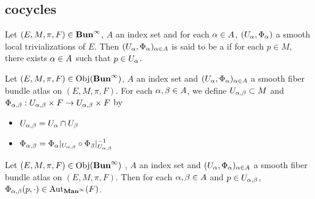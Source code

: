 \documentclass{book}
\begin{document}
	
	
	
	
	
	
	
	
	
	
	
	
	
	
	
	
	
	
	
	
	
	
	











	\subsection{cocycles}
	
	
	
	
	
	\begin{defn} 
		Let $(E, M, \pi, F) \in \operatorname*{\text{\textbf{Bun}}^{\infty}}$, $A$ an index set and for each $\alpha \in A$, $(U_{\alpha}, \Phi_{\alpha})$ a smooth local trivializations of $E$. Then $(U_{\alpha}, \Phi_{\alpha})_{\alpha \in A}$ is said to be a  if for each $p \in M$, there exists $\alpha \in A$ such that $p \in U_{\alpha}$.
	\end{defn}
	
	
	\begin{defn}
		Let $(E, M, \pi, F) \in \operatorname{Obj}(\operatorname*{\text{\textbf{Bun}}^{\infty}})$, $A$ an index set and $(U_{\alpha}, \Phi_{\alpha})_{\alpha \in A}$ a smooth fiber bundle atlas on $(E, M, \pi, F)$. For each $\alpha,\beta \in A$, we define $U_{\alpha,\beta} \subset M$ and $\Phi_{\alpha,\beta}: U_{\alpha,\beta} \times F \rightarrow U_{\alpha,\beta} \times F$ by 
		\begin{itemize}
			\item $U_{\alpha, \beta} = U_{\alpha} \cap U_{\beta}$
			\item $\Phi_{\alpha, \beta} = \Phi_{\alpha}|_{U_{\alpha, \beta}} \circ \Phi_{\beta}|_{U_{\alpha, \beta}}^{-1}$
		\end{itemize}
	\end{defn}
	
	\begin{ex}
		Let $(E, M, \pi, F) \in \operatorname{Obj}(\operatorname*{\text{\textbf{Bun}}^{\infty}})$ , $A$ an index set and $(U_{\alpha}, \Phi_{\alpha})_{\alpha \in A}$ a smooth fiber bundle atlas on $(E, M, \pi, F)$. Then for each $\alpha, \beta \in A$ and $p \in U_{\alpha, \beta}$, $\Phi_{\alpha,\beta}(p, \cdot) \in \operatorname{Aut}_{\operatorname*{\text{\textbf{Man}}^{\infty}}}(F)$.
	\end{ex}
	
\end{document}
